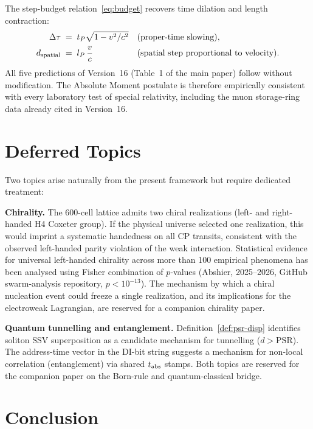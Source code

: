 \documentclass[12pt]{article}
\begin{document}
The step-budget relation~\eqref{eq:budget} recovers time dilation and length
contraction:
\begin{align}
  \Delta\tau &\;=\; t_P\sqrt{1 - v^2/c^2}
  &&\text{(proper-time slowing)},\\
  d_{\rm spatial} &\;=\; l_P\,\frac{v}{c}
  &&\text{(spatial step proportional to velocity)}.
\end{align}
All five predictions of Version~16 (Table~1 of the main paper) follow without
modification.  The Absolute Moment postulate is therefore empirically
consistent with every laboratory test of special relativity, including the
muon storage-ring data already cited in Version~16.

\section{Deferred Topics}
\label{sec:deferred}

Two topics arise naturally from the present framework but require dedicated
treatment:

\textbf{Chirality.}  The 600-cell lattice admits two chiral realizations
(left- and right-handed H4 Coxeter group).  If the physical universe selected
one realization, this would imprint a systematic handedness on all CP
transits, consistent with the observed left-handed parity violation of the
weak interaction.  Statistical evidence for universal left-handed chirality
across more than 100 empirical phenomena has been analysed using Fisher
combination of $p$-values (Abshier, 2025--2026, GitHub swarm-analysis
repository, $p < 10^{-13}$).  The mechanism by which a chiral nucleation
event could freeze a single realization, and its implications for the
electroweak Lagrangian, are reserved for a companion chirality paper.

\textbf{Quantum tunnelling and entanglement.}  Definition~\ref{def:psr-disp}
identifies soliton SSV superposition as a candidate mechanism for tunnelling
($d > \text{PSR}$).  The address-time vector in the DI-bit string suggests a
mechanism for non-local correlation (entanglement) via shared $t_{\rm abs}$
stamps.  Both topics are reserved for the companion paper on the Born-rule
and quantum-classical bridge.

\section{Conclusion}
\label{sec:conclusion}
\end{document}
